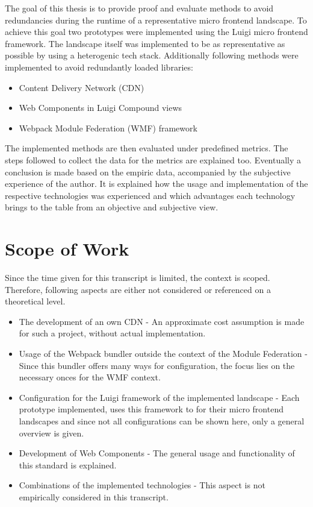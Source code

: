 The goal of this thesis is to provide proof and evaluate methods to avoid redundancies during the runtime of a representative micro frontend landscape. To achieve this goal two prototypes were implemented using the Luigi micro frontend framework. The landscape itself was implemented to be as representative as possible by using a heterogenic tech stack. Additionally following methods were implemented to avoid redundantly loaded libraries:

\begin{itemize}
	\item Content Delivery Network (CDN)
	\item Web Components in Luigi Compound views
	\item Webpack Module Federation (WMF) framework
\end{itemize}

The implemented methods are then evaluated under predefined metrics. The steps followed to collect the data for the metrics are explained too.
Eventually a conclusion is made based on the empiric data, accompanied by the subjective experience of the author. It is explained how the usage and implementation of the respective technologies was experienced and which advantages each technology brings to the table from an objective and subjective view.
  
\section{Scope of Work}

Since the time given for this transcript is limited, the context is scoped. Therefore, following aspects are either not considered or referenced on a theoretical level.

\begin{itemize}
	\item The development of an own CDN - An approximate cost assumption is made for such a project, without actual implementation.
	\item Usage of the Webpack bundler outside the context of the Module Federation - Since this bundler offers many ways for configuration, the focus lies on the necessary onces for the WMF context.
	\item Configuration for the Luigi framework of the implemented landscape - Each prototype implemented, uses this framework to for their micro frontend landscapes and since not all configurations can be shown here, only a general overview is given.
	\item Development of Web Components - The general usage and functionality of this standard is explained.
	\item Combinations of the implemented technologies - This aspect is not empirically considered in this transcript.
\end{itemize}


